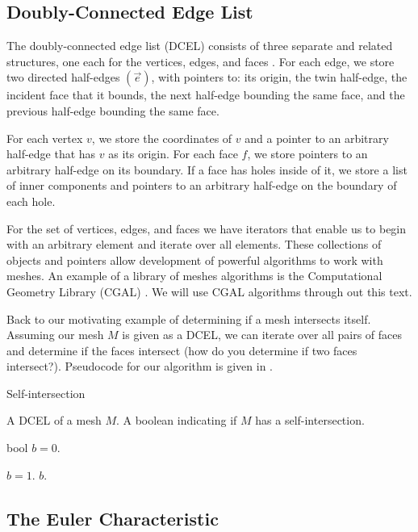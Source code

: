 \subsection{Doubly-Connected Edge List}

The doubly-connected edge list (DCEL) consists of three separate and related structures, one each
for the vertices, edges, and faces \cite{dutchbook3}.
For each edge, we store two directed half-edges $(\overrightarrow{e})$, with pointers to: its origin, the twin half-edge, the incident face that it bounds, the next half-edge bounding the same face, and the previous half-edge bounding the same face.


For each vertex $v$, we store the coordinates of $v$ and a pointer to an arbitrary half-edge
that has $v$ as its origin.
For each face $f$, we store pointers to an arbitrary half-edge on its boundary. If a face has holes inside of it, we store a list of inner components and pointers to an arbitrary half-edge  on the boundary of each hole.

For the set of vertices, edges, and faces we have iterators that enable us to begin with an arbitrary element
and iterate over all elements. These collections of objects and pointers allow development of
powerful algorithms to work with meshes. An example of a library of meshes algorithms
is the Computational Geometry Library (CGAL) \cite{cgal, cgal:eb-24b}. We will use CGAL algorithms
through out this text.


Back to our motivating example of determining if a mesh intersects itself. 
Assuming our mesh $M$ is given as a DCEL, we can iterate over all pairs of faces
and determine if the faces intersect (how do you determine if two faces intersect?).
Pseudocode for our algorithm is given in .


\begin{algorithm}
 \caption{Self-intersection}\label{alg:self-intersection}
    \begin{algorithmic}[1]
      \Require A DCEL of a mesh $M.$
        \Ensure A boolean indicating if $M$ has a self-intersection.
        
        \State bool $b=0.$
	
		\State $b=1.$
	\EndIf 
	\EndFor
\EndFor
\Return $b$.
\end{algorithmic}
\end{algorithm}

\subsection{The Euler Characteristic}

